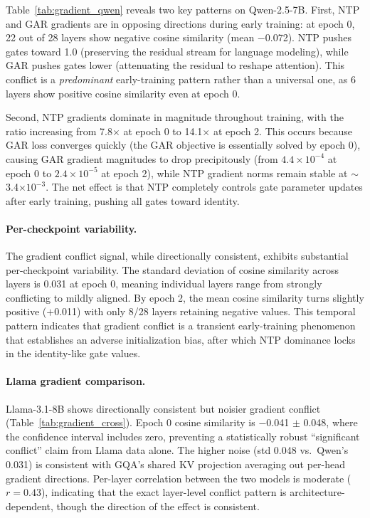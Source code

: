 \documentclass[11pt,a4paper]{article}
\begin{document}
Table~\ref{tab:gradient_qwen} reveals two key patterns on Qwen-2.5-7B. First, NTP and GAR gradients are in opposing directions during early training: at epoch 0, 22 out of 28 layers show negative cosine similarity (mean $-$0.072). NTP pushes gates toward 1.0 (preserving the residual stream for language modeling), while GAR pushes gates lower (attenuating the residual to reshape attention). This conflict is a \emph{predominant} early-training pattern rather than a universal one, as 6 layers show positive cosine similarity even at epoch 0.

Second, NTP gradients dominate in magnitude throughout training, with the ratio increasing from 7.8$\times$ at epoch 0 to 14.1$\times$ at epoch 2. This occurs because GAR loss converges quickly (the GAR objective is essentially solved by epoch 0), causing GAR gradient magnitudes to drop precipitously (from $4.4 \times 10^{-4}$ at epoch 0 to $2.4 \times 10^{-5}$ at epoch 2), while NTP gradient norms remain stable at $\sim$3.4$\times 10^{-3}$. The net effect is that NTP completely controls gate parameter updates after early training, pushing all gates toward identity.

\paragraph{Per-checkpoint variability.} The gradient conflict signal, while directionally consistent, exhibits substantial per-checkpoint variability. The standard deviation of cosine similarity across layers is 0.031 at epoch 0, meaning individual layers range from strongly conflicting to mildly aligned. By epoch 2, the mean cosine similarity turns slightly positive ($+$0.011) with only 8/28 layers retaining negative values. This temporal pattern indicates that gradient conflict is a transient early-training phenomenon that establishes an adverse initialization bias, after which NTP dominance locks in the identity-like gate values.

\paragraph{Llama gradient comparison.} Llama-3.1-8B shows directionally consistent but noisier gradient conflict (Table~\ref{tab:gradient_cross}). Epoch 0 cosine similarity is $-$0.041 $\pm$ 0.048, where the confidence interval includes zero, preventing a statistically robust ``significant conflict'' claim from Llama data alone. The higher noise (std 0.048 vs.\ Qwen's 0.031) is consistent with GQA's shared KV projection averaging out per-head gradient directions. Per-layer correlation between the two models is moderate ($r = 0.43$), indicating that the exact layer-level conflict pattern is architecture-dependent, though the direction of the effect is consistent.
\end{document}
